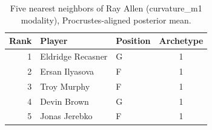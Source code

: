 \begin{table}[htbp]
  \centering\small
  \begin{tabular}{rllc}
    \toprule
    Rank & Player & Position & Archetype \\
    \midrule
    1 & Eldridge Recasner & G & 1 \\
    2 & Ersan Ilyasova & F & 1 \\
    3 & Troy Murphy & F & 1 \\
    4 & Devin Brown & G & 1 \\
    5 & Jonas Jerebko & F & 1 \\
    \bottomrule
  \end{tabular}
  \caption{Five nearest neighbors of Ray Allen (curvature_m1 modality), Procrustes-aligned posterior mean.}
  \label{tab:Ray_Allen_neighbors_curvature_m1}
\end{table}

